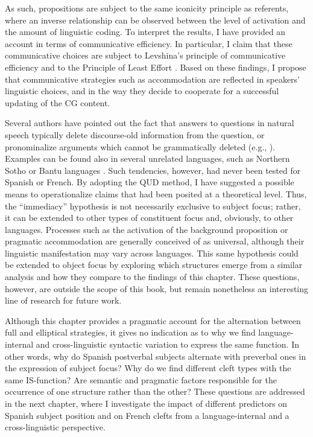 As such, propositions are subject to the same iconicity principle \parencite{chiarcos2011mental} as referents, where an inverse relationship can be observed between the level of activation and the amount of linguistic coding.
To interpret the results, I have provided an account in terms of communicative efficiency. In particular, I claim that these communicative choices are subject to Levshina's principle of communicative efficiency \parencite{Levshina_2022} and to the Principle of Least Effort \parencite{zipf1949human}. Based on these findings, I propose that communicative strategies such as accommodation are reflected in speakers' linguistic choices, and in the way they decide to cooperate for a successful updating of the CG content.

Several authors have pointed out the fact that answers to questions in natural speech typically delete discourse-old information from  the question, or pronominalize arguments which cannot be grammatically deleted (e.g., \cite{krifka2008basic}). Examples can be found also in several unrelated languages, such as Northern Sotho \parencite{zerbian2007investigating} or Bantu languages \parencite{downing2016information}. Such tendencies, however, had never been tested for Spanish or French. By adopting the QUD method, I have suggested a possible means to operationalize claims that had been posited at a theoretical level. Thus, the ``immediacy” hypothesis is not necessarily exclusive to subject focus; rather, it can be extended to other types of constituent focus and, obviously, to other languages. Processes such as the activation of the background proposition or pragmatic accommodation are generally conceived of as universal, although their linguistic manifestation may vary across languages. This same hypothesis could be extended to object focus by exploring which structures emerge from a similar analysis and how they compare to the findings of this chapter. These questions, however, are outside the scope of this book, but remain nonetheless an interesting line of research for future work.

Although this chapter provides a pragmatic account for the alternation between full and elliptical strategies, it gives no indication as to why we find lan\-guage-internal and cross-linguistic syntactic variation to express the same function. In other words, why do Spanish postverbal subjects alternate with preverbal ones in the expression of subject focus? Why do we find different cleft types with the same IS-function? Are semantic and pragmatic factors responsible for the occurrence of one structure rather than the other? These questions are addressed in the next chapter, where I investigate the impact of different predictors on Spanish subject position and on French clefts from a language-internal and a cross-linguistic perspective.
